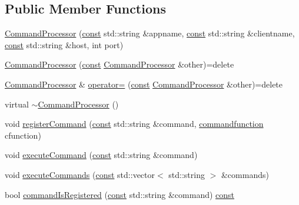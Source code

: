 \subsection*{Public Member Functions}
\begin{DoxyCompactItemize}
\item 
\hyperlink{class_command_processor_a053c5d39a7c42ddaeeab11467a052e98}{Command\+Processor} (\hyperlink{functions__c_8js_afacfd9c985d225bb07483b887a801b6f}{const} std\+::string \&appname, \hyperlink{functions__c_8js_afacfd9c985d225bb07483b887a801b6f}{const} std\+::string \&clientname, \hyperlink{functions__c_8js_afacfd9c985d225bb07483b887a801b6f}{const} std\+::string \&host, int port)
\item 
\hyperlink{class_command_processor_ad3ed59d0f22d979f2010a541a08c1ee3}{Command\+Processor} (\hyperlink{functions__c_8js_afacfd9c985d225bb07483b887a801b6f}{const} \hyperlink{class_command_processor}{Command\+Processor} \&other)=delete
\item 
\hyperlink{class_command_processor}{Command\+Processor} \& \hyperlink{class_command_processor_a1068633e1f6af69a67de06f10d8dba3a}{operator=} (\hyperlink{functions__c_8js_afacfd9c985d225bb07483b887a801b6f}{const} \hyperlink{class_command_processor}{Command\+Processor} \&other)=delete
\item 
virtual \hyperlink{class_command_processor_a8b975af12657aab33323c1b6c5bb2961}{$\sim$\+Command\+Processor} ()
\item 
void \hyperlink{class_command_processor_a72e15bc0082d628bd05aacedd5aa7ee0}{register\+Command} (\hyperlink{functions__c_8js_afacfd9c985d225bb07483b887a801b6f}{const} std\+::string \&command, \hyperlink{_command_processor_8h_a28db7178a71eff1027c055c9b19f6215}{commandfunction} cfunction)
\item 
void \hyperlink{class_command_processor_a3a830f1939e458f31f0cd2d42855609f}{execute\+Command} (\hyperlink{functions__c_8js_afacfd9c985d225bb07483b887a801b6f}{const} std\+::string \&command)
\item 
void \hyperlink{class_command_processor_a9c23c88fe12e643092993a8bb2aa0528}{execute\+Commands} (\hyperlink{functions__c_8js_afacfd9c985d225bb07483b887a801b6f}{const} std\+::vector$<$ std\+::string $>$ \&commands)
\item 
bool \hyperlink{class_command_processor_a11c9458174f6909a46b20d26bc489f68}{command\+Is\+Registered} (\hyperlink{functions__c_8js_afacfd9c985d225bb07483b887a801b6f}{const} std\+::string \&command) \hyperlink{functions__c_8js_afacfd9c985d225bb07483b887a801b6f}{const} 

\end{DoxyCompactItemize}
